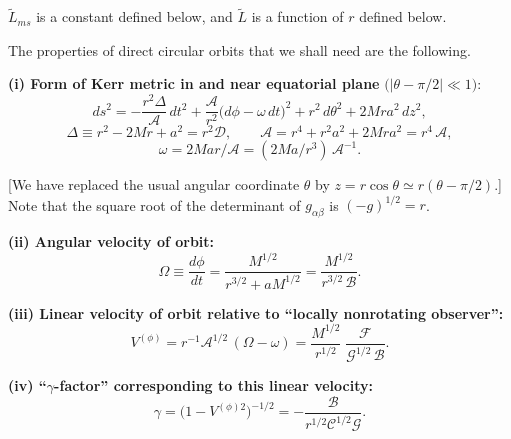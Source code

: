 $\tilde{L}_{ms}$ is a constant defined below, and $\tilde{L}$ is a function of $r$ defined below.

The properties of direct circular orbits that we shall need are the following.

\medskip
\noindent
\textbf{(i) Form of Kerr metric in and near equatorial plane}
$\bigl(|\theta - \pi/2| \ll 1\bigr)$:
%
\begin{equation}
ds^2 = -\frac{r^2\Delta}{\mathscr{A}}\,dt^2 + \frac{\mathscr{A}}{r^2}
\bigl(d\phi - \omega\,dt\bigr)^2 + r^2\,d\theta^2 + 2Mra^2\,dz^2 ,
\tag{5.4.2a}
\end{equation}
%
\begin{equation}
\Delta \equiv r^2 - 2Mr + a^2 = r^2\mathscr{D},\qquad
\mathscr{A} = r^4 + r^2a^2 + 2Mra^2 = r^4\,\mathscr{A},
\tag{5.4.2b}
\end{equation}
%
\begin{equation}
\omega = 2Mar/\mathscr{A} = (2Ma/r^3)\,\mathscr{A}^{-1}.
\tag{5.4.2b}
\end{equation}

[We have replaced the usual angular coordinate $\theta$ by
$z = r\cos\theta \simeq r(\theta - \pi/2)$.]
Note that the square root of the determinant of $g_{\alpha\beta}$ is
$(-g)^{1/2} = r$.

\medskip
\noindent
\textbf{(ii) Angular velocity of orbit:}
%
\begin{equation}
\Omega \equiv \frac{d\phi}{dt} = \frac{M^{1/2}}{r^{3/2} + aM^{1/2}}
= \frac{M^{1/2}}{r^{3/2}\,\mathscr{B}}.
\tag{5.4.3}
\end{equation}

\medskip
\noindent
\textbf{(iii) Linear velocity of orbit relative to ``locally nonrotating observer'':}
%
\begin{equation}
V^{(\phi)} = r^{-1}\mathscr{A}^{1/2}\,(\Omega - \omega)
= \frac{M^{1/2}}{r^{1/2}}\;\frac{\mathscr{F}}
{\mathscr{G}^{1/2}\,\mathscr{B}}.
\tag{5.4.4}
\end{equation}

\medskip
\noindent
\textbf{(iv) ``$\gamma$-factor'' corresponding to this linear velocity:}
%
\begin{equation}
\gamma = \bigl(1 - V^{(\phi)2}\bigr)^{-1/2}
= -\frac{\mathscr{B}}{r^{1/2}\mathscr{C}^{1/2}\mathscr{G}}.
\tag{5.4.4b}
\end{equation}

